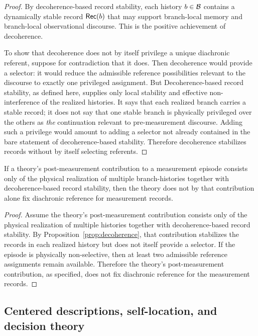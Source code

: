 \begin{proof}
By decoherence-based record stability, each history $b\in\mathcal{B}$ contains a dynamically stable record
$\mathsf{Rec}(b)$ that may support branch-local memory and branch-local observational discourse. This is the
positive achievement of decoherence.

To show that decoherence does not by itself privilege a unique diachronic referent, suppose for
contradiction that it does. Then decoherence would provide a selector: it would reduce the admissible
reference possibilities relevant to the discourse to exactly one privileged assignment. But
Decoherence-based record stability, as defined here, supplies only local stability and effective
non-interference of the realized histories. It says that each realized branch carries a stable record; it
does not say that one stable branch is physically privileged over the others as \emph{the}
continuation relevant to pre-measurement discourse. Adding such a privilege would amount to adding
a selector not already contained in the bare statement of decoherence-based stability. Therefore
decoherence stabilizes records without by itself selecting referents.
\end{proof}

\begin{theorem}
\label{thm:decoherence_nonselection}
If a theory's post-measurement contribution to a measurement episode consists only of the physical
realization of multiple branch-histories together with decoherence-based record stability, then the
theory does not by that contribution alone fix diachronic reference for measurement records.
\end{theorem}

\begin{proof}
Assume the theory's post-measurement contribution consists only of the physical realization of
multiple histories together with decoherence-based record stability. By
Proposition~\ref{prop:decoherence}, that contribution stabilizes the records in each realized history but
does not itself provide a selector. If the episode is physically non-selective, then at least two
admissible reference assignments remain available. Therefore the theory's post-measurement
contribution, as specified, does not fix diachronic reference for the measurement records.
\end{proof}

\subsection{Centered descriptions, self-location, and decision theory}

